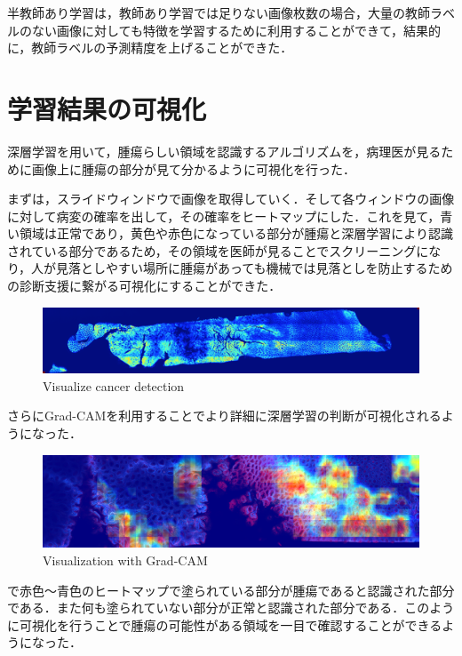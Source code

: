 半教師あり学習は，教師あり学習では足りない画像枚数の場合，大量の教師ラベルのない画像に対しても特徴を学習するために利用することができて，結果的に，教師ラベルの予測精度を上げることができた．

\section{学習結果の可視化}
深層学習を用いて，腫瘍らしい領域を認識するアルゴリズムを，病理医が見るために画像上に腫瘍の部分が見て分かるように可視化を行った．


まずは，スライドウィンドウで画像を取得していく．そして各ウィンドウの画像に対して病変の確率を出して，その確率をヒートマップにした．これを見て，青い領域は正常であり，黄色や赤色になっている部分が腫瘍と深層学習により認識されている部分であるため，その領域を医師が見ることでスクリーニングになり，人が見落としやすい場所に腫瘍があっても機械では見落としを防止するための診断支援に繋がる可視化にすることができた．

\begin{figure}[H]
	\centering
	\includegraphics[width=0.7\linewidth]{fig/chapter4/visualization/sample_B}
	\caption{Visualize cancer detection}
	\label{fig:sampleb}
\end{figure}

さらにGrad-CAMを利用することでより詳細に深層学習の判断が可視化されるようになった．
\begin{figure}[H]
	\centering
	\includegraphics[width=0.7\linewidth]{fig/chapter4/large-grad-cam-step100-rm-black}
	\caption{Visualization with Grad-CAM}
	\label{fig:large-grad}
\end{figure}

で赤色〜青色のヒートマップで塗られている部分が腫瘍であると認識された部分である．また何も塗られていない部分が正常と認識された部分である．このように可視化を行うことで腫瘍の可能性がある領域を一目で確認することができるようになった．
